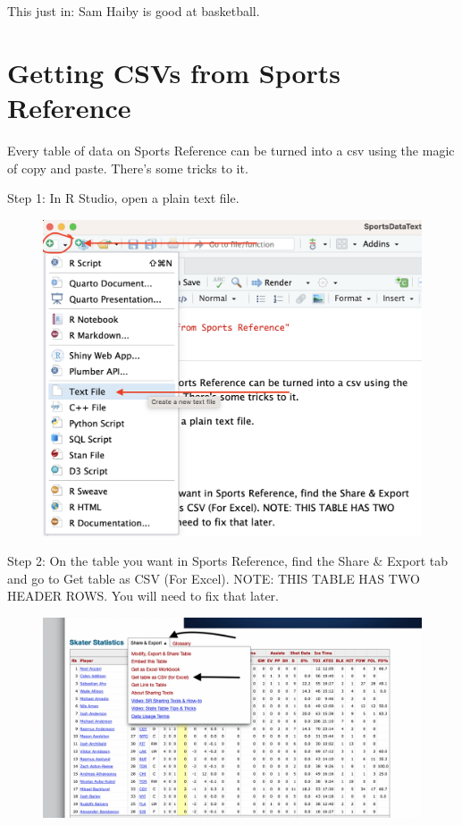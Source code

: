 \documentclass[
  letterpaper,
  DIV=11,
  numbers=noendperiod]{scrreprt}
\begin{document}
This just in: Sam Haiby is good at basketball.


\hypertarget{getting-csvs-from-sports-reference}{%
\chapter{Getting CSVs from Sports
Reference}\label{getting-csvs-from-sports-reference}}

Every table of data on Sports Reference can be turned into a csv using
the magic of copy and paste. There's some tricks to it.

Step 1: In R Studio, open a plain text file.

\begin{figure}

\includegraphics[width=1\textwidth,height=\textheight]{./images/csv1.png} \hfill{}

\end{figure}

Step 2: On the table you want in Sports Reference, find the Share \&
Export tab and go to Get table as CSV (For Excel). NOTE: THIS TABLE HAS
TWO HEADER ROWS. You will need to fix that later.

\begin{figure}

{\centering \includegraphics[width=1\textwidth,height=\textheight]{./images/csv3.png}

}

\end{figure}
\end{document}
